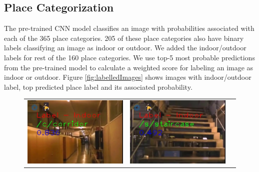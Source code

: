 \documentclass[twocolumn]{article}
\begin{document}
\subsection{Place Categorization}

The pre-trained CNN model classifies an image with probabilities associated with each of the 365 place categories. 205 of these place categories also have binary labels classifying an image as indoor or outdoor. We added the indoor/outdoor labels for rest of the 160 place categories. We use top-5 most probable predictions from the pre-trained model to calculate a weighted score for labeling an image as indoor or outdoor. Figure \ref{fig:labelledImages} shows images with indoor/outdoor label, top predicted place label and its associated probability.

\newcommand{\scaleVal}{0.28}
\begin{figure}[!htbp]
 \begin{tabular*}{\textwidth}{lcr}
  \includegraphics[scale=\scaleVal]{1-corridor} &
  \includegraphics[scale=\scaleVal]{2-staircase} &

\end{tabular*}
\end{figure}
\end{document}
